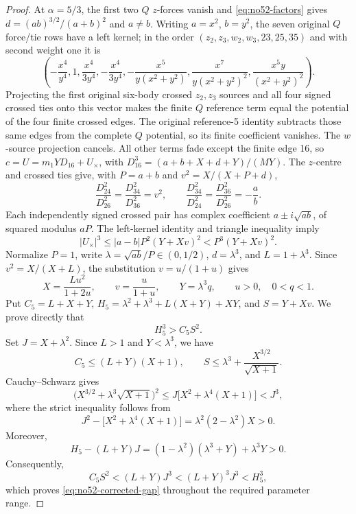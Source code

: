 \documentclass[11pt]{amsart}
\theoremstyle{remark}
\begin{document}
\begin{proof}
At $\alpha=5/3$, the first two $Q$ $z$-forces vanish and \eqref{eq:no52-factors} gives $d=(ab)^{3/2}/(a+b)^2$ and $a\ne b$. Writing $a=x^2$, $b=y^2$, the seven original $Q$ force/tie rows have a left kernel; in the order $(z_2,z_3,w_2,w_3,23,25,35)$ and with second weight one it is
\begin{equation}\label{eq:no52-left-kernel}
\left(-\frac{x^4}{y^4},1,\frac{x^4}{3y^4},-\frac{x^4}{3y^4},-\frac{x^5}{y(x^2+y^2)},\frac{x^7}{y(x^2+y^2)^2},\frac{x^5y}{(x^2+y^2)^2}\right).
\end{equation}
Projecting the first original six-body crossed $z_2,z_3$ sources and all four signed crossed ties onto this vector makes the finite $Q$ reference term equal the potential of the four finite crossed edges. The original reference-5 identity subtracts those same edges from the complete $Q$ potential, so its finite coefficient vanishes. The $w$-source projection cancels. All other terms fade except the finite edge 16, so $c=U=m_1YD_{16}+U_\times$, with $D_{16}^3=(a+b+X+d+Y)/(MY)$. The $z$-centre and crossed ties give, with $P=a+b$ and $v^2=X/(X+P+d)$,
\begin{equation}\label{eq:no52-cross-ratios}
\frac{D_{24}^2}{D_{26}^2}=\frac{D_{34}^2}{D_{36}^2}=v^2,\qquad \frac{D_{34}^2}{D_{24}^2}=\frac{D_{36}^2}{D_{26}^2}=-\frac ab.
\end{equation}
Each independently signed crossed pair has complex coefficient $a\pm i\sqrt{ab}$, of squared modulus $aP$. The left-kernel identity and triangle inequality imply
\begin{equation}\label{eq:no52-cross-bound}
|U_\times|^3\le |a-b|P^2(Y+Xv)^2<P^3(Y+Xv)^2.
\end{equation}
Normalize $P=1$, write $\lambda=\sqrt{ab}/P\in(0,1/2)$, $d=\lambda^3$, and $L=1+\lambda^3$. Since $v^2=X/(X+L)$, the substitution $v=u/(1+u)$ gives
\[
X=\frac{Lu^2}{1+2u},\qquad v=\frac{u}{1+u},\qquad Y=\lambda^3q,\qquad u>0,\quad 0<q<1.
\]
Put $C_5=L+X+Y$, $H_5=\lambda^2+\lambda^3+L(X+Y)+XY$, and $S=Y+Xv$. We prove directly that
\begin{equation}\label{eq:no52-corrected-gap}
H_5^3>C_5S^2.
\end{equation}
Set $J=X+\lambda^2$. Since $L>1$ and $Y<\lambda^3$, we have
\[
C_5\le(L+Y)(X+1),\qquad S\le\lambda^3+\frac{X^{3/2}}{\sqrt{X+1}}.
\]
Cauchy--Schwarz gives
\[
\bigl(X^{3/2}+\lambda^3\sqrt{X+1}\bigr)^2
\le J\bigl[X^2+\lambda^4(X+1)\bigr]<J^3,
\]
where the strict inequality follows from
\[
J^2-\bigl[X^2+\lambda^4(X+1)\bigr]=\lambda^2(2-\lambda^2)X>0.
\]
Moreover,
\[
H_5-(L+Y)J=(1-\lambda^2)(\lambda^3+Y)+\lambda^3Y>0.
\]
Consequently,
\[
C_5S^2<(L+Y)J^3<(L+Y)^3J^3<H_5^3,
\]
which proves \eqref{eq:no52-corrected-gap} throughout the required parameter range.


\end{proof}
\end{document}
